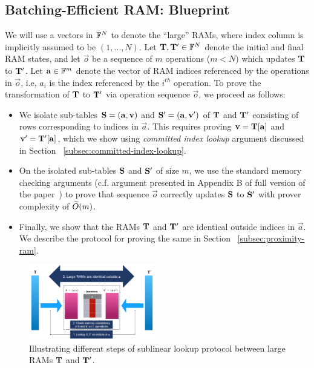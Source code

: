 \subsection{Batching-Efficient RAM: Blueprint}\label{subsec:batching-efficient-ram-blueprint}
We will use a vectors in $\mathbb{F}^N$ to denote the ``large'' RAMs, where index column is implicitly
assumed to be $(1,\ldots,N)$.
Let $\mathbf{T},\mathbf{T'}\in \mathbb{F}^N$ denote the initial and final RAM states, and let $\vec{o}$ be
a sequence of $m$ operations ($m < N$) which updates $\mathbf{T}$ to $\mathbf{T}'$. Let $\mathbf{a}\in \mathbb{F}^m$ denote the vector
of RAM indices referenced by the operations in $\vec{o}$, i.e, $a_i$ is the index referenced by the $i^{th}$ operation.
To prove the transformation of $\mathbf{T}$ to $\mathbf{T}'$ via operation sequence $\vec{o}$, we proceed as follows:
\begin{itemize}[leftmargin=1em, label=-]
    \item We isolate sub-tables $\mathbf{S}=(\mathbf{a},\mathbf{v})$ and $\mathbf{S}'=(\mathbf{a},\mathbf{v'})$ of $\mathbf{T}$ and $\mathbf{T}'$ consisting of
    rows corresponding to indices in $\vec{a}$. This requires proving $\mathbf{v}=\mathbf{T}[\mathbf{a}]$ and $\mathbf{v'}=
    \mathbf{T}'[\mathbf{a}]$, which we show using {\em committed index lookup} argument discussed in Section ~\ref{subsec:committed-index-lookup}.

    \item On the isolated sub-tables $\mathbf{S}$ and $\mathbf{S}'$ of size $m$, we use the standard memory checking arguments (c.f. argument
    presented in Appendix B of full version of the paper~\cite{full-ver}) to prove that sequence $\vec{o}$ correctly updates $\mathbf{S}$ to $\mathbf{S}'$ with
    prover complexity of $\widetilde{O}(m)$.

    \item Finally, we show that the RAMs $\mathbf{T}$ and $\mathbf{T}'$ are identical outside indices in $\vec{a}$. We describe the protocol
    for proving the same in Section ~\ref{subsec:proximity-ram}.
\end{itemize}

\begin{figure}[htbp]
    \centering
    \includegraphics[width=0.49\textwidth]{RAM-Lookup}
    \caption{Illustrating different steps of sublinear lookup protocol between large RAMs $\mathbf{T}$ and $\mathbf{T}'$.}
    \label{fig:blueprint}
\end{figure}

